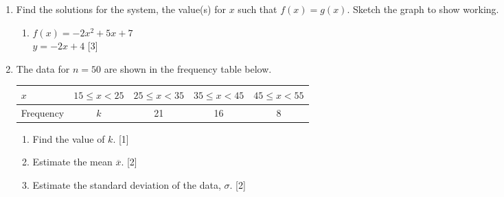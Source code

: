 \documentclass[12pt, twoside]{article}
\begin{document}
\begin{enumerate}
\newpage
    \item Find the solutions for the system, the value(s) for $x$ such that $f(x)=g(x)$. Sketch the graph to show working.
    \begin{enumerate}
        \item $f(x)=-2x^2+5x+7$ \\[0.25cm] $y=-2x+4$ \hfill [3] \vspace{0.3cm}
    \end{enumerate}

\item The data for $n=50$ are shown in the frequency table below.
    \begin{center}
        \begin{tabular}{|l|c|c|c|c|}
            \hline
            $x$ & $15 \leq x < 25$ & $25 \leq x < 35$ & $35 \leq x < 45$ & $45 \leq x < 55$\\ 
            \hline 
            Frequency & $k$ & 21 & 16 & 8\\ 
            \hline 
            \end{tabular}
    \end{center}
    \begin{enumerate}
        \item Find the value of $k$.  \hfill [1]
        \item Estimate the mean $\overline{x}$. \hfill [2]
        \item Estimate the standard deviation of the data, $\sigma$.  \hfill [2]
        \end{enumerate}
           
\end{enumerate}
\end{document}
